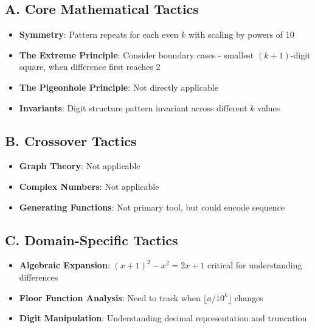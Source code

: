\documentclass[]{article}
\begin{document}
\begin{tacticalbox}
\subsection*{A. Core Mathematical Tactics}
\begin{itemize}[leftmargin=*]
    \item \textbf{Symmetry}: Pattern repeats for each even $k$ with scaling by powers of 10
    \item \textbf{The Extreme Principle}: Consider boundary cases - smallest $(k+1)$-digit square, when difference first reaches 2
    \item \textbf{The Pigeonhole Principle}: Not directly applicable
    \item \textbf{Invariants}: Digit structure pattern invariant across different $k$ values
\end{itemize}

\subsection*{B. Crossover Tactics}
\begin{itemize}[leftmargin=*]
    \item \textbf{Graph Theory}: Not applicable
    \item \textbf{Complex Numbers}: Not applicable
    \item \textbf{Generating Functions}: Not primary tool, but could encode sequence
\end{itemize}

\subsection*{C. Domain-Specific Tactics}
\begin{itemize}[leftmargin=*]
    \item \textbf{Algebraic Expansion}: $(x+1)^2 - x^2 = 2x + 1$ critical for understanding differences
    \item \textbf{Floor Function Analysis}: Need to track when $\lfloor a/10^k \rfloor$ changes
    \item \textbf{Digit Manipulation}: Understanding decimal representation and truncation
\end{itemize}
\end{tacticalbox}
\end{document}
